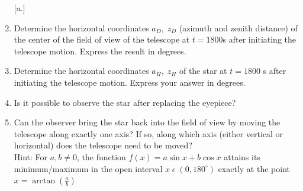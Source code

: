 \documentclass[a4paper,12pt]{extarticle}
\begin{document}
\begin{enumerate} [a.]
	\item Determine the horizontal coordinates $a_D, \; z_D$ (azimuth and zenith distance) of the center of the field of view of the telescope at $t = 1800$s after initiating the telescope motion. Express the result in degrees.
	\item Determine the horizontal coordinates $a_H,\; z_H$ of the star at $t = 1800$ s after initiating the telescope motion. Express your answer in degrees.		
	\item Is it possible to observe the star after replacing the eyepiece?
	\item Can the observer bring the star back into the field of view by moving the telescope along exactly one axis? If so, along which axis (either vertical or horizontal) does the telescope need to be moved?\\
	Hint: For $a,b\neq 0$, the function $f(x)=a\sin x+b \cos x$ attains its minimum/maximum in the open interval $x \; \epsilon \; (0,180^\circ)$ exactly at the point $x=\arctan\left(\frac{a}{b}\right)$
\end{enumerate}
\end{document}
